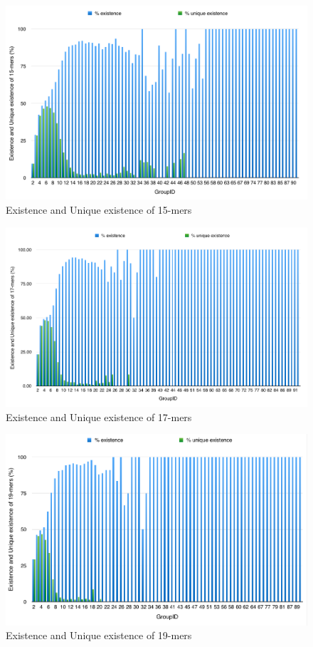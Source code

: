 \documentclass[11pt]{article}
\begin{document}
\begin{figure}
    \centering
    \includegraphics[scale=0.41]{image/15Plot.png}
    \caption{Existence and Unique existence of 15-mers}
    \label{fig:15}
\end{figure}
\begin{figure}
    \centering
    \includegraphics[scale=0.50]{image/17Plot.png}
    \caption{Existence and Unique existence of 17-mers}
    \label{fig:17}
\end{figure}\begin{figure}
    \centering
    \includegraphics[scale=0.48]{image/19Plot.png}
    \caption{Existence and Unique existence of 19-mers}
    \label{fig:19}
\end{figure}
\end{document}
